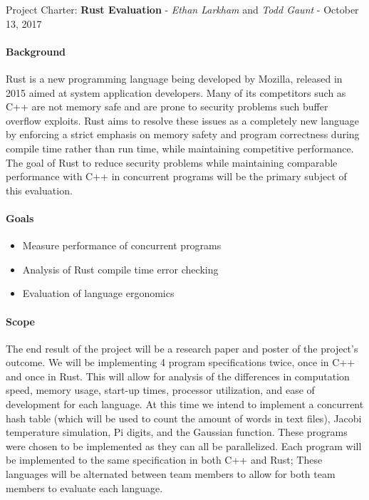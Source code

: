 \documentclass[10pt,a4paper]{report}
\begin{document}
\begin{center}
	{\Large Project Charter: {\bfseries Rust Evaluation}}
	- {\large{\itshape Ethan Larkham} and {\itshape Todd Gaunt}}
	- {\large October 13, 2017}
\end{center}
\vspace{0.5em}
\paragraph{Background}
Rust is a new programming language being developed by Mozilla, released in 2015
aimed at system application developers. Many of its competitors such as C++ are
not memory safe and are prone to security problems such buffer overflow
exploits. Rust aims to resolve these issues as a completely new language by
enforcing a strict emphasis on memory safety and program correctness during
compile time rather than run time, while maintaining competitive performance.
The goal of Rust to reduce security problems while maintaining comparable
performance with C++ in concurrent programs will be the primary subject of this
evaluation.
\paragraph{Goals}
\begin{flushleft}
	\begin{itemize}
		\item Measure performance of concurrent programs
		\item Analysis of Rust compile time error checking
		\item Evaluation of language ergonomics
	\end{itemize}
\end{flushleft}
\paragraph{Scope}
The end result of the project will be a research paper and poster of the
project's outcome.  We will be implementing 4 program specifications twice, once in C++ and
once in Rust. This will allow for analysis of the differences in computation
speed, memory usage, start-up times, processor utilization, and ease of
development for each language.
At this time we intend to implement a concurrent hash table (which will be used to count the
amount of words in text files), Jacobi temperature simulation,  Pi
digits, and the Gaussian function. These programs were chosen to be implemented
as they can all be parallelized. Each program will be implemented to the same
specification in both C++ and Rust; These languages will be alternated between
team members to allow for both team members to evaluate each language.
\end{document}
